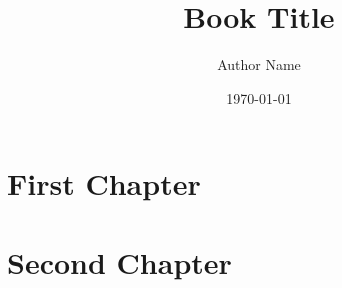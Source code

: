 \documentclass[12pt,a4paper]{book}
\title{Book Title}
\author{Author Name}
\date{\today}
\begin{document}
\frontmatter
\maketitle
\tableofcontents

\mainmatter

\chapter{First Chapter}

\chapter{Second Chapter}

\backmatter
\end{document}
